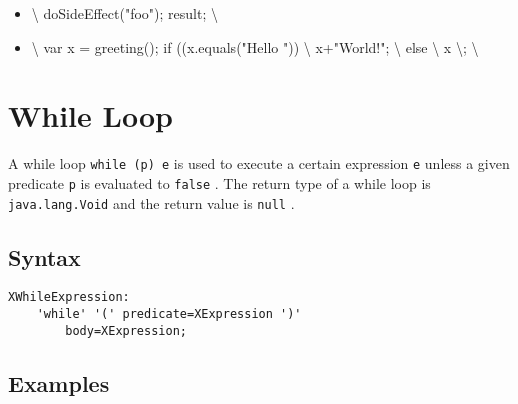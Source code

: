 \documentclass[a4paper,10pt]{scrreprt}
\newlength{\itemindentlen}
\begin{document}
\setlength{\itemindentlen}{\textwidth}
\begin{itemize}
\addtolength{\itemindentlen}{-2em}

\item \begin{minipage}[t]{\itemindentlen}

	\textbackslash{}{
		doSideEffect("foo");
		result;
	\textbackslash{}}
	
\end{minipage}

\item \begin{minipage}[t]{\itemindentlen}

	\textbackslash{}{
		var x = greeting();
		if ((x.equals("Hello ")) \textbackslash{}{
			x+"World!"; 
		\textbackslash{}} else \textbackslash{}{
			x
		\textbackslash{}};
	\textbackslash{}}
	
\end{minipage}

\end{itemize}
\addtolength{\itemindentlen}{2em}







\section{While Loop\label{WhileExpression}}
A while loop \lstinline{while (p) e}
 is used to execute a certain expression \lstinline{e}
 unless a given predicate \lstinline{p}
 is evaluated to \lstinline{false}
.
The return type of a while loop is \lstinline{java.lang.Void}
 and the return value is \lstinline{null}
.

\subsection{Syntax}
\begin{lstlisting}
XWhileExpression:
	'while' '(' predicate=XExpression ')'
		body=XExpression;

\end{lstlisting}
 




\subsection{Examples}
\end{document}
